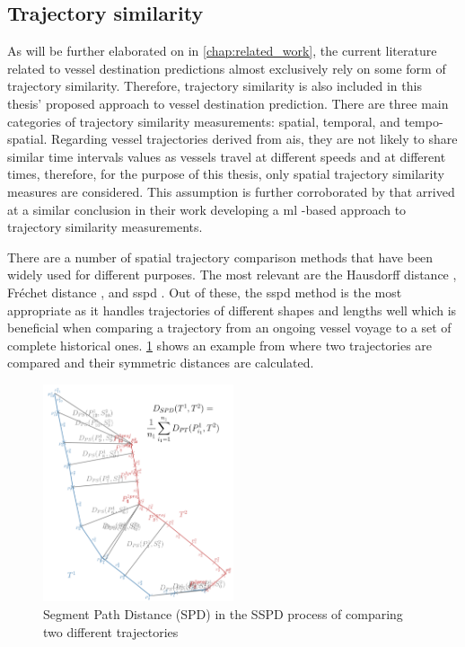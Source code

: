 \subsection{Trajectory similarity}
\label{sec:trajectory_similarity}

As will be further elaborated on in \cref{chap:related_work}, the current literature related to vessel destination predictions almost exclusively rely on some form of trajectory similarity. Therefore, trajectory similarity is also included in this thesis' proposed approach to vessel destination prediction. There are three main categories of trajectory similarity measurements: spatial, temporal, and tempo-spatial. Regarding vessel trajectories derived from \acrshort{ais}, they are not likely to share similar time intervals values as vessels travel at different speeds and at different times, therefore, for the purpose of this thesis, only spatial trajectory similarity measures are considered. This assumption is further corroborated by \cite{Zhang2020AISApproach} that arrived at a similar conclusion in their work developing a \acrfull{ml} -based approach to trajectory similarity measurements.

There are a number of spatial trajectory comparison methods that have been widely used for different purposes. The most relevant are the Hausdorff distance \parencite{magdy2015}, Fréchet distance \parencite{magdy2015}, and \acrfull{sspd} \parencite{besse2015review}. Out of these, the \acrshort{sspd} method is the most appropriate as it handles trajectories of different shapes and lengths well which is beneficial when comparing a trajectory from an ongoing vessel voyage to a set of complete historical ones. \cref{fig:sspd} shows an example from \cite{besse2015review} where two trajectories are compared and their symmetric distances are calculated.

\begin{figure}[htbp]  %
    \centering
    \includegraphics[width=0.5\textwidth]{figures/sspd}
    \caption{Segment Path Distance (SPD) in the SSPD process of comparing two different trajectories \parencite{besse2015review}}
    \label{fig:sspd}
\end{figure}

